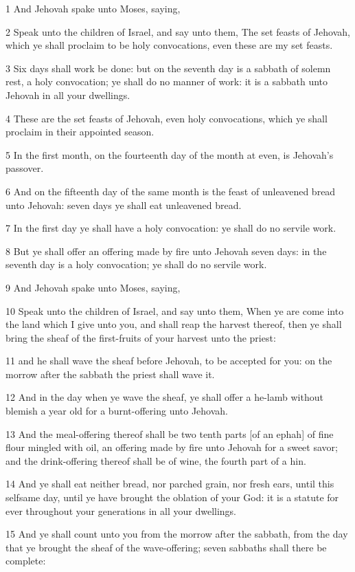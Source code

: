 \par 1 And Jehovah spake unto Moses, saying,
\par 2 Speak unto the children of Israel, and say unto them, The set feasts of Jehovah, which ye shall proclaim to be holy convocations, even these are my set feasts.
\par 3 Six days shall work be done: but on the seventh day is a sabbath of solemn rest, a holy convocation; ye shall do no manner of work: it is a sabbath unto Jehovah in all your dwellings.
\par 4 These are the set feasts of Jehovah, even holy convocations, which ye shall proclaim in their appointed season.
\par 5 In the first month, on the fourteenth day of the month at even, is Jehovah's passover.
\par 6 And on the fifteenth day of the same month is the feast of unleavened bread unto Jehovah: seven days ye shall eat unleavened bread.
\par 7 In the first day ye shall have a holy convocation: ye shall do no servile work.
\par 8 But ye shall offer an offering made by fire unto Jehovah seven days: in the seventh day is a holy convocation; ye shall do no servile work.
\par 9 And Jehovah spake unto Moses, saying,
\par 10 Speak unto the children of Israel, and say unto them, When ye are come into the land which I give unto you, and shall reap the harvest thereof, then ye shall bring the sheaf of the first-fruits of your harvest unto the priest:
\par 11 and he shall wave the sheaf before Jehovah, to be accepted for you: on the morrow after the sabbath the priest shall wave it.
\par 12 And in the day when ye wave the sheaf, ye shall offer a he-lamb without blemish a year old for a burnt-offering unto Jehovah.
\par 13 And the meal-offering thereof shall be two tenth parts [of an ephah] of fine flour mingled with oil, an offering made by fire unto Jehovah for a sweet savor; and the drink-offering thereof shall be of wine, the fourth part of a hin.
\par 14 And ye shall eat neither bread, nor parched grain, nor fresh ears, until this selfsame day, until ye have brought the oblation of your God: it is a statute for ever throughout your generations in all your dwellings.
\par 15 And ye shall count unto you from the morrow after the sabbath, from the day that ye brought the sheaf of the wave-offering; seven sabbaths shall there be complete:
